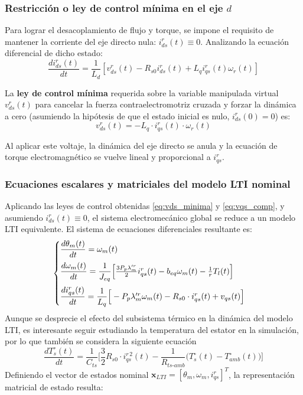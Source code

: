 \documentclass[12pt, a4paper,journal, onecolumn, compsoc]{IEEEtran}
\begin{document}
\subsubsection{Restricción o ley de control mínima en el eje $d$}
Para lograr el desacoplamiento de flujo y torque, se impone el requisito de mantener la corriente del eje directo nula: $i_{ds}^r(t) \equiv 0$. Analizando la ecuación diferencial de dicho estado:
\begin{equation}
    \frac{di_{ds}^r(t)}{dt} = \frac{1}{L_d} \left[ v_{ds}^r(t) - R_{s0} i_{ds}^r(t) + L_q i_{qs}^r(t) \omega_r(t) \right]
\end{equation}

La \textbf{ley de control mínima} requerida sobre la variable manipulada virtual $v_{ds}^r(t)$ para cancelar la fuerza contraelectromotriz cruzada y forzar la dinámica a cero (asumiendo la hipótesis de que el estado inicial es nulo, $i_{ds}^r(0) = 0$) es:
\begin{equation} \label{eq:vds_minima}
    v_{ds}^r(t) = -L_q \cdot i_{qs}^r(t) \cdot \omega_r(t)
\end{equation}

Al aplicar este voltaje, la dinámica del eje directo se anula y la ecuación de torque electromagnético se vuelve lineal y proporcional a $i_{qs}^r$.

\subsubsection{Ecuaciones escalares y matriciales del modelo LTI nominal}
Aplicando las leyes de control obtenidas \eqref{eq:vds_minima} y \eqref{eq:vqs_comp}, y asumiendo $i_{ds}^r(t) \equiv 0$, el sistema electromecánico global se reduce a un modelo LTI equivalente. El sistema de ecuaciones diferenciales resultante es:
\begin{equation} \label{eq:sis_escalar_LTI}
\begin{cases}
    \vspace{0.2cm}
    \dfrac{d\theta_m(t)}{dt} = \omega_m(t) \\
    \vspace{0.2cm}
    \dfrac{d\omega_m(t)}{dt} = \dfrac{1}{J_{eq}}\Big[\frac{3 P_p \lambda'^r_m}{2} i_{qs}^r(t) - b_{eq} \omega_m(t) - \frac{1}{r} T_l(t)\Big] \\
    \dfrac{di_{qs}^r(t)}{dt} = \dfrac{1}{L_q}\Big[-P_p \lambda'^r_m \omega_m(t) - R_{s0}\cdot i_{qs}^r(t) + v_{qs}(t)\Big]
\end{cases}
\end{equation}
Aunque se desprecie el efecto del subsistema térmico en la dinámica del modelo LTI, es interesante seguir estudiando la temperatura del estator en la simulación, por lo que también se considera la siguiente ecuación
\[\dfrac{dT_s^\circ(t)}{dt} = \dfrac{1}{C_{ts}}\Big[\frac{3}{2}R_{s0}\cdot i_{qs}^{r\,2}(t)-\frac{1}{R_{ts\text{-}amb}}\big(T_s^\circ(t) - T_{amb}^\circ(t)\big)\Big]\]
Definiendo el vector de estados nominal $\bm{x}_{LTI} = [\theta_m, \omega_m, i_{qs}^r]^T$, la representación matricial de estado resulta:
\end{document}
